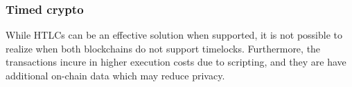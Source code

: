 \documentclass{article}      	%
\begin{document}
\subsubsection{Timed crypto}
While HTLCs can be an effective solution when supported, it is not possible to realize when both blockchains do not support timelocks. Furthermore, the transactions incure in higher execution costs due to scripting, and they are have additional on-chain data which may reduce privacy. \\

\end{document}
